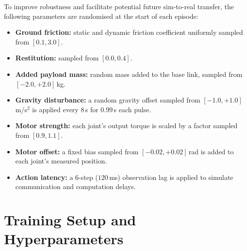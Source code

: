 To improve robustness and facilitate potential future sim-to-real transfer,
the following parameters are randomised at the start of each episode:
\begin{itemize}
  \item \textbf{Ground friction:} static and dynamic friction coefficient
        uniformly sampled from $[0.1, 3.0]$.
  \item \textbf{Restitution:} sampled from $[0.0, 0.4]$.
  \item \textbf{Added payload mass:} random mass added to the base link,
        sampled from $[-2.0, +2.0]$\,kg.
  \item \textbf{Gravity disturbance:} a random gravity offset sampled from
        $[-1.0, +1.0]$\,m/s$^2$ is applied every $8$\,s
        for $0.99$\,s each pulse.
  \item \textbf{Motor strength:} each joint's output torque is scaled by a
        factor sampled from $[0.9, 1.1]$.
  \item \textbf{Motor offset:} a fixed bias sampled from $[-0.02, +0.02]$\,rad
        is added to each joint's measured position.
  \item \textbf{Action latency:} a 6-step ($120$\,ms) observation lag is
        applied to simulate communication and computation delays.
\end{itemize}

\section{Training Setup and Hyperparameters}

